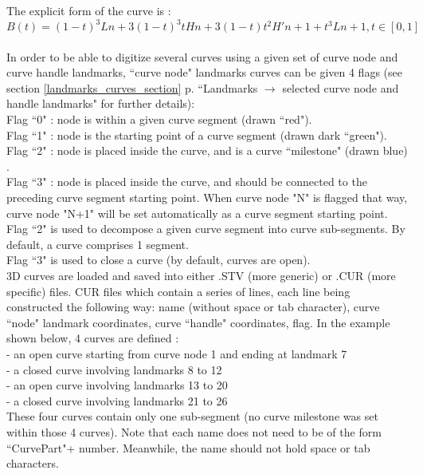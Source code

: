 The explicit form of the curve is :
\begin{equation}
B(t) = (1-t)^{3}Ln + 3(1-t)^{3}tHn + 3(1-t)t^{2}H'n+1 +t^{3}Ln+1, t \in[0,1]
\end{equation}
\\
In order to be able to digitize several curves using a given set of curve node and curve handle landmarks,
``curve node" landmarks curves can be given 4 flags (see section \ref{landmarks_curves_section} p.\pageref{landmarks_curves_section} ``Landmarks $\rightarrow$ selected curve node and handle landmarks" for further details):\\
Flag ``0" : node is within a given curve segment (drawn ``red").\\
Flag ``1" : node is the starting point of a curve segment (drawn dark ``green").\\
Flag ``2" : node is placed inside the curve, and is a curve ``milestone" (drawn blue) .\\
Flag ``3" : node is placed inside the curve, and should be connected to the preceding curve
segment starting point. When curve node "N" is flagged that way, curve node "N+1" will be set automatically as a curve segment starting point.\\
Flag ``2" is used to decompose a given curve segment into curve sub-segments. By default, a curve comprises 1 segment.\\
Flag ``3" is used to close a curve (by default, curves are open).\\
3D curves are loaded and saved into either .STV (more generic) or .CUR (more specific) files. CUR files which contain a series of lines, each line being
constructed the following way: name (without space or tab character), curve ``node" landmark
coordinates, curve ``handle" coordinates, flag.
In the example shown below, 4 curves are defined :\\
- an open curve starting from curve node 1 and ending at landmark 7\\
- a closed curve involving landmarks 8 to 12\\
- an open curve involving landmarks 13 to 20\\
- a closed curve involving landmarks 21 to 26\\
These four curves contain only one sub-segment (no curve milestone was set within those 4 curves).
Note that each name does not need to be of the form ``CurvePart"+ number. Meanwhile, the name
should not hold space or tab characters.

